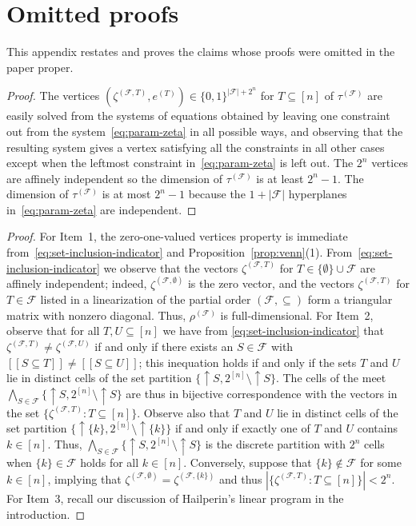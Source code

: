 \documentclass[11pt]{article}
\newcommand{\iv}[1]{\ensuremath{[\![{#1}]\!]}}
\newcommand{\vp}{\ensuremath{\tau}}
\newcommand{\cp}{\ensuremath{\rho}}
\begin{document}
\section{Omitted proofs}

\label{sect:proofs}

This appendix restates and proves the claims whose proofs were omitted
in the paper proper.

\vpgeom*

\begin{proof}
The vertices $(\zeta^{(\mathcal{F},T)},e^{(T)})\in\{0,1\}^{|\mathcal{F}|+2^n}$
for $T\subseteq[n]$ of $\vp^{(\mathcal{F})}$
are easily solved from the systems of equations obtained
by leaving one constraint out from the system~\eqref{eq:param-zeta} in all
possible ways, and observing that the resulting system gives a vertex 
satisfying all the constraints in all other cases except when 
the leftmost constraint in~\eqref{eq:param-zeta} is left out.
The $2^n$ vertices are affinely independent so the dimension of 
$\vp^{(\mathcal{F})}$ 
is at least $2^n-1$. The dimension of $\vp^{(\mathcal{F})}$ 
is at most $2^n-1$ because the 
$1+|\mathcal{F}|$ hyperplanes in~\eqref{eq:param-zeta} are
independent. 
\end{proof}

\cpgeom*

\begin{proof}
For Item~1, the zero-one-valued vertices property is
immediate from~\eqref{eq:set-inclusion-indicator} and
Proposition~\ref{prop:venn}(1).
From~\eqref{eq:set-inclusion-indicator} we observe that the vectors
$\zeta^{(\mathcal{F},T)}$ for $T\in\{\emptyset\}\cup\mathcal{F}$ are affinely
independent; indeed, $\zeta^{(\mathcal{F},\emptyset)}$ is the zero vector,
and the vectors $\zeta^{(\mathcal{F},T)}$ for $T\in\mathcal{F}$ 
listed in a linearization of the partial order $(\mathcal{F},\subseteq)$ 
form a triangular matrix with nonzero diagonal. Thus, 
$\cp^{(\mathcal{F})}$ is full-dimensional. For Item~2, 
observe that for all $T,U\subseteq[n]$ we have 
from \eqref{eq:set-inclusion-indicator} that 
$\zeta^{(\mathcal{F},T)}\neq \zeta^{(\mathcal{F},U)}$ if and only
if there exists an $S\in\mathcal{F}$ with 
$\iv{S\subseteq T}\neq\iv{S\subseteq U}$; this inequation holds
if and only if the sets $T$ and $U$ lie in distinct cells of the
set partition $\{\uparrow\!S,2^{[n]}\setminus\!\uparrow\!S\}$. The cells
of the meet 
$\bigwedge_{S\in\mathcal{F}}\{\uparrow\!S,2^{[n]}\setminus\!\uparrow\!S\}$
are thus in bijective correspondence with the vectors in the set
$\{\zeta^{(\mathcal{F},T)}:T\subseteq[n]\}$.
Observe also that $T$ and $U$ lie in distinct cells of the
set partition $\{\uparrow\!\{k\},2^{[n]}\setminus\!\uparrow\!\{k\}\}$
if and only if exactly one of $T$ and $U$ contains $k\in[n]$. Thus,
$\bigwedge_{S\in\mathcal{F}}\{\uparrow\!S,2^{[n]}\setminus\!\uparrow\!S\}$
is the discrete partition with $2^n$ cells when $\{k\}\in\mathcal{F}$ holds
for all $k\in[n]$. Conversely, suppose that $\{k\}\notin\mathcal{F}$ for
some $k\in [n]$, implying that 
$\zeta^{(\mathcal{F},\emptyset)}=\zeta^{(\mathcal{F},\{k\})}$ and thus
$|\{\zeta^{(\mathcal{F},T)}:T\subseteq[n]\}|<2^n$.
For Item~3, recall our discussion of Hailperin's linear program in 
the introduction.
\end{proof}
\end{document}
